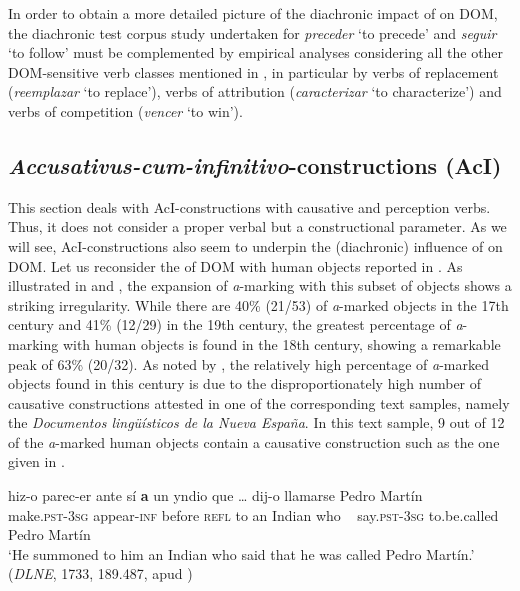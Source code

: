 \documentclass[output=paper]{LSP/langsci}
\begin{document}
In order to obtain a more detailed picture of the diachronic impact of  on DOM, the diachronic test corpus study undertaken for \textit{preceder} ‘to precede’ and \textit{seguir} ‘to follow’ must be complemented by empirical analyses considering all the other DOM-sensitive verb classes mentioned in , in particular by verbs of replacement (\eg \textit{reemplazar} ‘to replace’), verbs of attribution (\eg \textit{caracterizar} ‘to characterize’) and verbs of competition (\eg \textit{vencer} ‘to win’).

\subsection{\textit{Accusativus-cum-infinitivo}-constructions (AcI)}\label{08-ga-sec:4.4}

This section deals with AcI-constructions with causative and perception verbs. Thus, it does not consider a proper verbal but a constructional parameter. As we will see, AcI-constructions also seem to underpin the (diachronic) influence of  on DOM. Let us reconsider the  of DOM with human  objects reported in . As illustrated in  and , the expansion of \textit{a}-marking with this subset of objects shows a striking irregularity. While there are 40\% (21/53) of \textit{a}-marked objects in the 17th century and 41\% (12/29) in the 19th century, the greatest percentage of \textit{a}-marking with  human objects is found in the 18th century, showing a remarkable peak of 63\% (20/32). As noted by \citet[460]{Laca2006Objeto}, the relatively high percentage of \textit{a}-marked objects found in this century is due to the disproportionately high number of causative constructions attested in one of the corresponding text samples, namely the \textit{Documentos lingüísticos de la Nueva España}. In this text sample, 9 out of 12 of the \textit{a}-marked  human objects contain a causative construction such as the one given in .

\ea \label{08-ga-ex:24}
\gll hiz-o parec-er ante sí \textbf{a} un yndio que {\ob}…{\cb} dij-o llamarse Pedro Martín\\
 make\textsc{.pst-}3\textsc{sg} appear-\textsc{inf} before \textsc{refl} to an Indian who ~ say.\textsc{pst-}3\textsc{sg} to.be.called Pedro Martín\\
\glt ‘He summoned to him an Indian who said that he was called Pedro Martín.’
(\textit{DLNE}, 1733, 189.487, apud \citealt[460]{Laca2006Objeto})
\z
\end{document}

